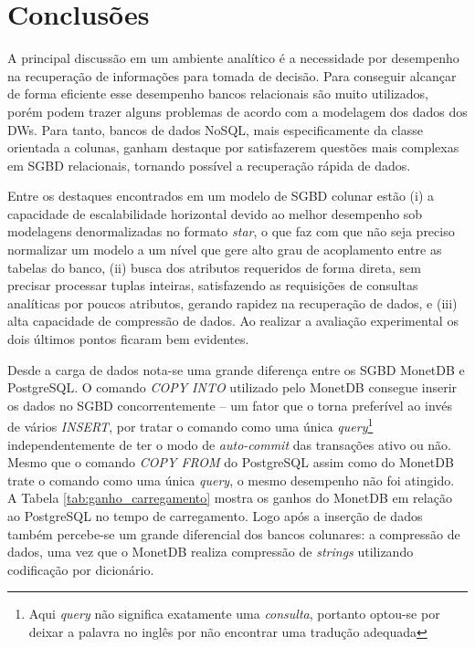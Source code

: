 \chapter{Conclusões}

A principal discussão em um ambiente analítico é a necessidade por desempenho na recuperação de informações para tomada de decisão. Para conseguir alcançar de forma eficiente esse desempenho bancos relacionais são muito utilizados, porém podem trazer alguns problemas de acordo com a modelagem dos dados dos DWs. Para tanto, bancos de dados NoSQL, mais especificamente da classe orientada a colunas, ganham destaque por satisfazerem questões mais complexas em SGBD relacionais, tornando possível a recuperação rápida de dados.

Entre os destaques encontrados em um modelo de SGBD colunar estão (i) a capacidade de escalabilidade horizontal devido ao melhor desempenho sob modelagens denormalizadas no formato \textit{star}, o que faz com que não seja preciso normalizar um modelo a um nível que gere alto grau de acoplamento entre as tabelas do banco, (ii) busca dos atributos requeridos de forma direta, sem precisar processar tuplas inteiras, satisfazendo as requisições de consultas analíticas por poucos atributos, gerando rapidez na recuperação de dados, e (iii) alta capacidade de compressão de dados. Ao realizar a avaliação experimental os dois últimos pontos ficaram bem evidentes.

Desde a carga de dados nota-se uma grande diferença entre os SGBD MonetDB e PostgreSQL. O comando \textit{COPY INTO} utilizado pelo MonetDB consegue inserir os dados no SGBD concorrentemente -- um fator que o torna preferível ao invés de vários \textit{INSERT}, por tratar o comando como uma única \textit{query}\footnote{Aqui \textit{query} não significa exatamente uma \textit{consulta}, portanto optou-se por deixar a palavra no inglês por não encontrar uma tradução adequada} independentemente de ter o modo de \textit{auto-commit} das transações ativo ou não. Mesmo que o comando \textit{COPY FROM} do PostgreSQL assim como do MonetDB trate o comando como uma única \textit{query}, o mesmo desempenho não foi atingido. A Tabela \ref{tab:ganho_carregamento} mostra os ganhos do MonetDB em relação ao PostgreSQL no tempo de carregamento. Logo após a inserção de dados também percebe-se um grande diferencial dos bancos colunares: a compressão de dados, uma vez que o MonetDB realiza compressão de \textit{strings} utilizando codificação por dicionário.

